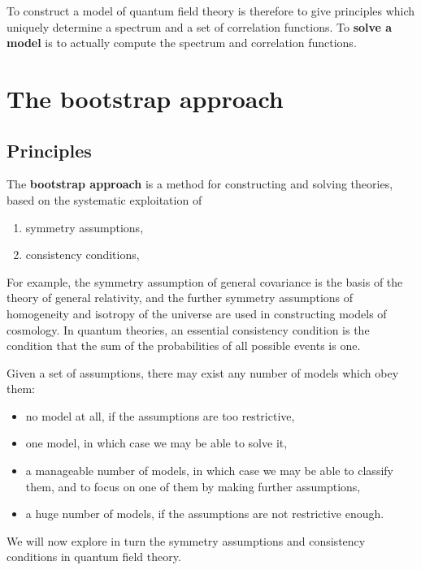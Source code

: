 \documentclass[12pt, a4paper, notitlepage, twoside]{report}
\numberwithin{equation}{section}
\theoremstyle{break}
\begin{document}
To construct a model of quantum field theory is therefore to give principles which uniquely determine a spectrum and a set of correlation functions.
To \textbf{\boldmath solve a model} is to actually compute the spectrum and correlation functions. 


\section{The bootstrap approach}

\subsection{Principles \label{secprin}}

The \textbf{\boldmath bootstrap approach} is a method for constructing and solving theories, based on the systematic exploitation of 
\begin{enumerate}
 \item symmetry assumptions,
 \item consistency conditions,
\end{enumerate}
For example, the symmetry assumption of general covariance is the basis of the theory of general relativity, and the further symmetry assumptions of homogeneity and isotropy of the universe are used in constructing models of cosmology.
In quantum theories, an essential consistency condition is the condition that the sum of the probabilities of all possible events is one. 

Given a set of assumptions, there may exist any number of models which obey them:
\begin{itemize}
 \item no model at all, if the assumptions are too restrictive,
\item one model, in which case we may be able to solve it,
\item a manageable number of models, in which case we may be able to classify them, and to focus on one of them by making further assumptions,
\item a huge number of models, if the assumptions are not restrictive enough.
\end{itemize}
We will now explore in turn the symmetry assumptions and consistency conditions in quantum field theory. 
\end{document}
